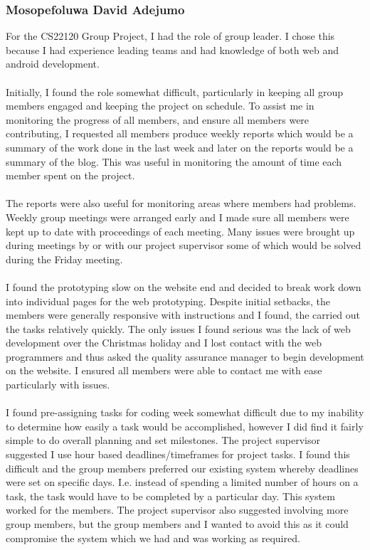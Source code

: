 \documentclass[12pt]{article}
\begin{document}
\subsubsection{Mosopefoluwa David Adejumo}
For the CS22120 Group Project, I had the role of group leader. I chose this because I had experience leading teams and had knowledge of both web and android development.~\\\\
Initially, I found the role somewhat difficult, particularly in keeping all group members engaged and keeping the project on schedule. To assist me in monitoring the progress of all members, and ensure all members were contributing, I requested all members produce weekly reports which would be a summary of the work done in the last week and later on the reports would be a summary of the blog. This was useful in monitoring the amount of time each member spent on the project. ~\\\\ 
The reports were also useful for monitoring areas where members had problems. Weekly group meetings were arranged early and I made sure all members were kept up to date with proceedings of each meeting. Many issues were brought up during meetings by or with our project supervisor some of which would be solved during the Friday meeting. ~\\\\
I found the prototyping slow on the website end and decided to break work down into individual pages for the web prototyping. Despite initial setbacks, the members were generally responsive with instructions and I found, the carried out the tasks relatively quickly. The only issues I found serious was the lack of web development over the Christmas holiday and I lost contact with the web programmers and thus asked the quality assurance manager to begin development on the website. I ensured all members were able to contact me with ease particularly with issues. ~\\\\ 
I found pre-assigning tasks for coding week somewhat difficult due to my inability to determine how easily a task would be accomplished, however I did find it fairly simple to do overall planning and set milestones. The project supervisor suggested I use hour based deadlines/timeframes for project tasks. I found this difficult and the group members preferred our existing system whereby deadlines were set on specific days. I.e. instead of spending a limited number of hours on a task, the task would have to be completed by a particular day. This system worked for the members. The project supervisor also suggested involving more group members, but the group members and I wanted to avoid this as it could compromise the system which we had and was working as required. ~\\\\
\end{document}
